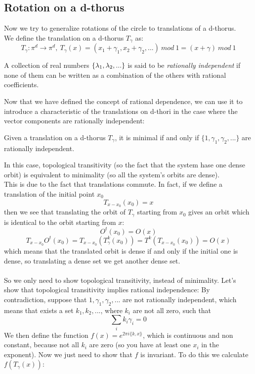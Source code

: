\subsection{Rotation on a d-thorus}
Now we try to generalize rotations of the circle to translations of a d-thorus. \\
We define the translation on a d-thorus $T_\gamma$ as:
$$
	T_\gamma : \pi^d \rightarrow \pi^d, \ T_\gamma (x) = (x_1 + \gamma_1, x_2 + \gamma_2, ...) \ mod \ 1 = (x + \gamma) \ mod \ 1
$$
\begin{definition}
	A collection of real numbers $\{\lambda_1,\lambda_2,...\}$	is said to be \textit{rationally independent} if none of them can be written as a combination of the others with rational coefficients.
\end{definition}
Now that we have defined the concept of rational dependence, we can use it to introduce a characteristic of the translations on d-thori in the case where the vector components are rationally independent:
\begin{prop}
	Given a translation on a d-thorus $T_\gamma$, it is minimal if and only if $\{1,\gamma_1,\gamma_2,...\}$ are rationally independent. 
\end{prop}
In this case, topological transitivity (so the fact that the system hase one dense orbit) is equivalent to minimality (so all the system's orbits are dense). \\ 
This is due to the fact that translations commute. In fact, if we define a translation of the initial point $x_0$
$$
	T_{x-x_0}(x_0) = x
$$
then we see that translating the orbit of $T_\gamma$ starting from $x_0$ gives an orbit which is identical to the orbit starting from $x$: 
$$
	O^t(x_0) = O(x)
$$
$$
	T_{x-x_0} O^t(x_0) = T_{x-x_0}(T^k_\gamma(x_0)) = T^k(T_{x-x_0}(x_0)) = O(x)
$$
which means that the translated orbit is dense if and only if the initial one is dense, so translating a dense set we get another dense set. \\ \\
So we only need to show topological transitivity, instead of minimality. Let's show that topological transitivity implies rational independence: By contradiction, suppose that $1,\gamma_1,\gamma_2,...$ are not rationally independent, which means that exists a set $k_1,k_2,...$, where $k_i$ are not all zero, such that
$$
	\sum_i k_i\gamma_i = 0
$$
We then define the function $f(x) = e^{2\pi i \lang k,x\rang}$, which is continuous and non constant, because not all $k_i$ are zero (so you have at least one $x_i$ in the exponent). Now we just need to show that $f$ is invariant. To do this we calculate $f(T_\gamma(x))$:
